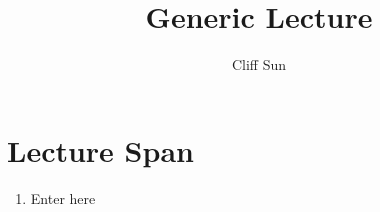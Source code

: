 \documentclass{article}
\title{Generic Lecture}
\author{Cliff Sun}
\newtheorem{one minute paper}[theorem]{One Minute Paper}
\begin{document}
\maketitle

\section*{Lecture Span}
\begin{enumerate}
    \item Enter here
\end{enumerate}
\end{document}
